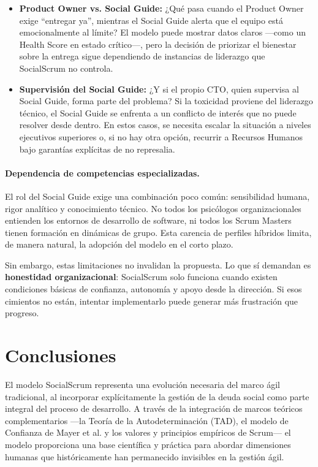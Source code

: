 \begin{itemize}
    \item \textbf{Product Owner vs. Social Guide:} ¿Qué pasa cuando el Product Owner exige ``entregar ya'', mientras el Social Guide alerta que el equipo está emocionalmente al límite? El modelo puede mostrar datos claros —como un Health Score en estado crítico—, pero la decisión de priorizar el bienestar sobre la entrega sigue dependiendo de instancias de liderazgo que SocialScrum no controla.
    \item \textbf{Supervisión del Social Guide:} ¿Y si el propio CTO, quien supervisa al Social Guide, forma parte del problema? Si la toxicidad proviene del liderazgo técnico, el Social Guide se enfrenta a un conflicto de interés que no puede resolver desde dentro. En estos casos, se necesita escalar la situación a niveles ejecutivos superiores o, si no hay otra opción, recurrir a Recursos Humanos bajo garantías explícitas de no represalia.
\end{itemize}

\paragraph{Dependencia de competencias especializadas.}
El rol del Social Guide exige una combinación poco común: sensibilidad humana, rigor analítico y conocimiento técnico. No todos los psicólogos organizacionales entienden los entornos de desarrollo de software, ni todos los Scrum Masters tienen formación en dinámicas de grupo. Esta carencia de perfiles híbridos limita, de manera natural, la adopción del modelo en el corto plazo.

Sin embargo, estas limitaciones no invalidan la propuesta. Lo que sí demandan es \textbf{honestidad organizacional}: SocialScrum solo funciona cuando existen condiciones básicas de confianza, autonomía y apoyo desde la dirección. Si esos cimientos no están, intentar implementarlo puede generar más frustración que progreso.

\section{Conclusiones}

El modelo SocialScrum representa una evolución necesaria del marco ágil tradicional, al incorporar explícitamente la gestión de la deuda social como parte integral del proceso de desarrollo.
A través de la integración de marcos teóricos complementarios —la Teoría de la Autodeterminación (TAD), el modelo de Confianza de Mayer et al. y los valores y principios empíricos de Scrum— el modelo proporciona una base científica y práctica para abordar dimensiones humanas que históricamente han permanecido invisibles en la gestión ágil.

